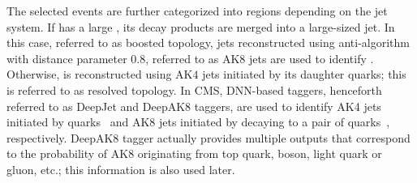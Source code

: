 \documentclass[a4paper,11pt]{article}
\newcommand{\Pb}{{{\Pqb}}\xspace}
\begin{document}
The selected events are further categorized into regions depending on the jet system. 
If \PH has a large \pt, its decay products are merged into a large-sized jet. 
In this case, referred to as boosted topology, 
jets reconstructed using anti-\kt algorithm with distance parameter 0.8, referred to as AK$8$ jets are used to identify \PH.
Otherwise, \PH is reconstructed using AK$4$ jets initiated by its daughter \Pb quarks; 
this is referred to as resolved topology.
In CMS, DNN-based taggers, henceforth referred to as DeepJet and DeepAK8 taggers, are used to identify AK4 jets initiated by \Pb quarks~\cite{Bols:2020bkb} and AK8 jets initiated by \PH decaying to a pair of \Pb quarks~\cite{Sirunyan:2020lcu}, respectively.
DeepAK8 tagger actually provides multiple outputs that correspond to the probability of AK8 originating from top quark, \PW boson, light quark or gluon, etc.; this information is also used later.
\end{document}
